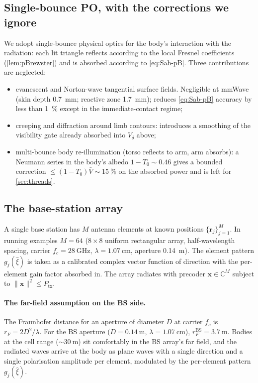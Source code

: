 \documentclass[11pt,a4paper]{article}
\theoremstyle{definition}
\newcommand{\rr}{\mathbf{r}}
\newcommand{\Complex}{\mathbb{C}}
\newcommand{\xvec}{\mathbf{x}}
\begin{document}
\subsection{Single-bounce PO, with the corrections we ignore}

We adopt single-bounce physical optics for the body's interaction
with the radiation: each lit triangle reflects according to the
local Fresnel coefficients (\cref{lem:pBrewster}) and is
absorbed according to \cref{eq:Sab-pB}.  Three contributions are
neglected:
\begin{itemize}[leftmargin=1.6em,itemsep=2pt]
\item evanescent and Norton-wave tangential surface fields.
Negligible at mmWave (skin depth \SI{0.7}{mm}; reactive zone
\SI{1.7}{mm}); reduces \cref{eq:Sab-pB} accuracy by less than
\SI{1}{\percent} except in the immediate-contact regime;
\item creeping and diffraction around limb contours: introduces a
smoothing of the visibility gate already absorbed into $V_\delta$
above;
\item multi-bounce body re-illumination (torso reflects to arm,
arm absorbs): a Neumann series in the body's albedo $1-T_0\sim
0.46$ gives a bounded correction $\le (1-T_0)\bar V\sim
\SI{15}{\percent}$ on the absorbed power and is left for
\cref{sec:threads}.
\end{itemize}

\subsection{The base-station array}

A single base station has $M$ antenna elements at known positions
$\{\rr_j\}_{j=1}^M$.  In running examples $M=64$ ($8\times 8$
uniform rectangular array, half-wavelength spacing, carrier
$f_c=\SI{28}{\GHz}$, $\lambda=\SI{1.07}{\cm}$, aperture
\SI{0.14}{\m}).  The element pattern $g_j(\hat\xi)$ is taken as a
calibrated complex vector function of direction with the per-element
gain factor absorbed in.  The array radiates with precoder
$\xvec\in\Complex^M$ subject to $\|\xvec\|^2\le P_{\mathrm{tx}}$.

\paragraph{The far-field assumption on the BS side.}  The Fraunhofer
distance for an aperture of diameter $D$ at carrier $f_c$ is
$r_F=2D^2/\lambda$.  For the BS aperture
($D=\SI{0.14}{\m}$, $\lambda=\SI{1.07}{\cm}$),
$r_F^{\mathrm{BS}}=\SI{3.7}{\m}$.  Bodies at the cell range
($\sim\SI{30}{\m}$) sit comfortably in the BS array's far field,
and the radiated waves arrive at the body as plane waves with a
single direction and a single polarisation amplitude per element,
modulated by the per-element pattern $g_j(\hat\xi)$.
\end{document}
